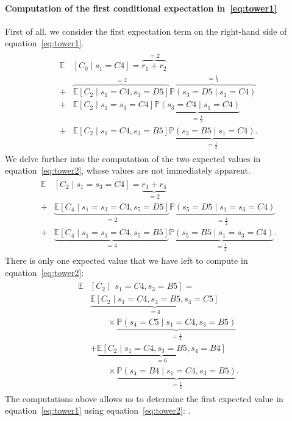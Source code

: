 \paragraph{Computation of the first conditional expectation
in~\eqref{eq:tower1}} 
First of all, we consider the first expectation term on the right-hand side of
equation~\eqref{eq:tower1}.
%
\begin{align}
    \begin{split}
    \mathbb{E}&\left[ C_0 \mid s_1 = C4 \right] = \overbrace{r_1 + r_2}^{=2} 
    \\ + &\overbrace{\mathbb{E}[C_2 \mid s_1 = C4, s_3 = D5]}^{=2} \overbrace{\mathbb{P}(s_3 = D5 \mid s_1 = C4)}^{=\frac{1}{3}} 
    \\ + &\mathbb{E}[C_2 \mid s_1 = s_3 = C4] \underbrace{\mathbb{P}(s_3 = C4 \mid s_1 = C4)}_{=\frac{1}{3}} \\
    + &\mathbb{E}[C_2 \mid s_1 = C4, s_3 = B5] \underbrace{\mathbb{P}(s_3 = B5 \mid s_1 = C4)}_{=\frac{1}{3}}.
    \end{split}
    \label{eq:tower2}
\end{align}
%
We delve further into the computation of the two expected values in
equation~\eqref{eq:tower2}, whose values are not immediately apparent.
%
\begin{align*}
    \begin{split}
    \mathbb{E}&[C_2 \mid s_1=s_3=C4] = \underbrace{r_3+r_4}_{=2}
    \\ + &\underbrace{\mathbb{E}[C_4 \mid s_1=s_3=C4, s_5=D5]}_{=2} \underbrace{\mathbb{P}(s_5=D5 \mid s_1=s_3=C4)}_{=\frac{1}{2}} \\
    + &\underbrace{\mathbb{E}[C_4 \mid s_1=s_3=C4, s_5=B5]}_{=4} \underbrace{\mathbb{P}(s_5=B5 \mid s_1=s_3=C4)}_{=\frac{1}{2}}.
    \end{split}
\end{align*}
%
There is only one expected value that we have left to compute in
equation~\eqref{eq:tower2}:
%
\begin{align*}
    \begin{split}
    \mathbb{E}&[C_2 \mid \; s_1=C4, s_3=B5] = \\
    &\underbrace{\mathbb{E}[C_2 \mid s_1=C4, s_3=B5, s_4=C5]}_{=4} \\ &{\phantom{1234}} \times \underbrace{\mathbb{P}(s_4=C5 \mid s_1=C4, s_3=B5)}_{=\frac{1}{2}} \\
    &+ \underbrace{\mathbb{E}[C_2 \mid s_1=C4, s_3=B5, s_4=B4]}_{=6} \\ &\phantom{1234} \times \underbrace{\mathbb{P}(s_4=B4 \mid s_1=C4, s_3=B5)}_{=\frac{1}{2}}.
    \end{split}
\end{align*}
%
The computations above allows us to determine the first expected value in
equation~\eqref{eq:tower1} using equation~\eqref{eq:tower2}:
.

